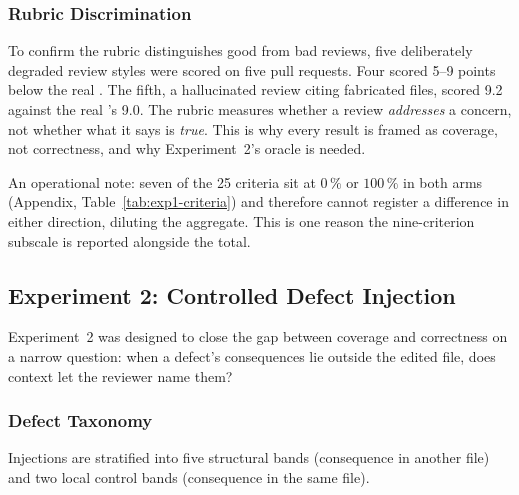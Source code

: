 \subsubsection{Rubric Discrimination}

To confirm the rubric distinguishes good from bad reviews, five deliberately
degraded review styles were scored on five pull requests. Four scored 5--9
points below the real \baseline{}. The fifth, a hallucinated review citing
fabricated files, scored 9.2 against the real \baseline{}'s 9.0. The rubric
measures whether a review \emph{addresses} a concern, not whether what it says
is \emph{true}. This is why every result is framed as coverage, not
correctness, and why Experiment~2's oracle is needed.

An operational note: seven of the 25 criteria sit at $0\,\%$ or $100\,\%$ in
both arms (Appendix, Table~\ref{tab:exp1-criteria}) and therefore cannot
register a difference in either direction, diluting the aggregate. This is
one reason the nine-criterion subscale is reported alongside the total.

\subsection{Experiment 2: Controlled Defect Injection}
\label{sec:injection-design}

Experiment~2 was designed to close the gap between coverage and correctness on
a narrow question: when a defect's consequences lie outside the edited file,
does context let the reviewer name them?

\subsubsection{Defect Taxonomy}

Injections are stratified into five structural bands (consequence in another
file) and two local control bands (consequence in the same file).

